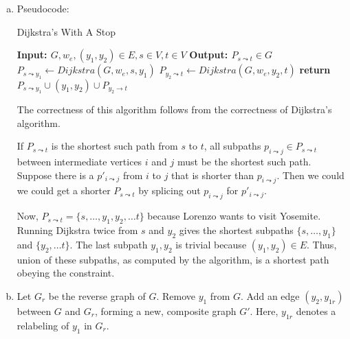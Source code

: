 \documentclass[10pt]{article}
\begin{document}
\begin{solution}

    \begin{enumerate}[(a)]
        \item {
        
            Pseudocode:
    
            \begin{algorithm}
                \caption{Dijkstra's With A Stop}
                \begin{algorithmic}[1]
                    \Statex \textbf{Input: $G, w_e, (y_1, y_2) \in E, s \in V, t \in V$}
                    \Statex \textbf{Output: $P_{s \leadsto t} \in G$}
                    \State $P_{s \leadsto y_1} \gets Dijkstra(G, w_e, s, y_1)$
                    \State $P_{y_2 \leadsto t} \gets Dijkstra(G, w_e, y_2, t)$
                    \State \textbf{return $P_{s \leadsto y_1} \cup (y_1, y_2) \cup P_{y_2 \rightarrow t}$}
                \end{algorithmic}
            \end{algorithm}

            The correctness of this algorithm follows from the correctness of 
            Dijkstra's algorithm. 

            If $P_{s \leadsto t}$ is the shortest such path from $s$ to $t$, 
            all subpaths $p_{i \leadsto j} \in P_{s \leadsto t}$ between 
            intermediate vertices $i$ and $j$ must be the shortest such path. 
            Suppose there is a $p'_{i \leadsto j}$ from $i$ to $j$ that is 
            shorter than $p_{i \leadsto j}$. Then we could we could get a 
            shorter $P_{s \leadsto t}$ by splicing out $p_{i \leadsto j}$ 
            for $p'_{i \leadsto j}$. 

            Now, $P_{s \leadsto t} = \{s, \dots, y_1, y_2, \dots t\}$ because 
            Lorenzo wants to visit Yosemite. 
            Running Dijkstra twice from $s$ and $y_2$ gives the shortest 
            subpaths $\{s, \dots, y_1\}$ and $\{y_2, \dots t\}$. 
            The last subpath ${y_1, y_2}$ is trivial because $(y_1, y_2) \in E$. 
            Thus, union of these subpaths, as computed by the algorithm, is a 
            shortest path obeying the constraint. 

        }

        \item {
            Let $G_r$ be the reverse graph of $G$. 
            Remove $y_1$ from $G$. Add an edge $(y_2, y_{1r})$ between $G$ and 
            $G_r$, forming a new, composite graph $G'$. 
            Here, $y_{1r}$ denotes a relabeling of $y_1$ in $G_r$. 

}
\end{enumerate}
\end{solution}
\end{document}

